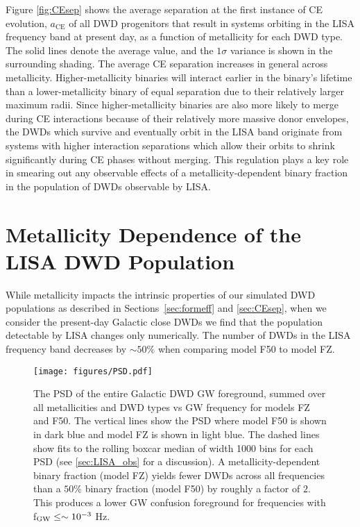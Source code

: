 \documentclass[twocolumn]{aastex631}
\begin{document}
Figure \ref{fig:CEsep} shows the average separation at the first instance of CE evolution, $a_{\text{CE}}$ of all DWD progenitors that result in systems orbiting in the LISA frequency band at present day, as a function of metallicity for each DWD type. The solid lines denote the average value, and the $1\sigma$ variance is shown in the surrounding shading. The average CE separation increases in general across metallicity. Higher-metallicity binaries will interact earlier in the binary's lifetime than a lower-metallicity binary of equal separation due to their relatively larger maximum radii. Since higher-metallicity binaries are also more likely to merge during CE interactions because of their relatively more massive donor envelopes, the DWDs which survive and eventually orbit in the LISA band originate from systems with higher interaction separations which allow their orbits to shrink significantly during CE phases without merging. This regulation plays a key role in smearing out any observable effects of a metallicity-dependent binary fraction in the population of DWDs observable by LISA. 


\section{Metallicity Dependence of the LISA DWD Population}
\label{sec:LISA_met}

While metallicity impacts the intrinsic properties of our simulated DWD populations as described in Sections~\ref{sec:formeff} and \ref{sec:CEsep}, when we consider the present-day Galactic close DWDs we find that the population detectable by LISA changes only numerically. The number of DWDs in the LISA frequency band decreases by $\sim50\%$ when comparing model F50 to model FZ.


\begin{figure}
	\texttt{[image: figures/PSD.pdf]}
    \caption{The PSD of the entire Galactic DWD GW foreground, summed over all metallicities and DWD types vs GW frequency for models FZ and F50. The vertical lines show the PSD where model F50 is shown in dark blue and model FZ is shown in light blue. The dashed lines show fits to the rolling boxcar median of width 1000 bins for each PSD (see \ref{sec:LISA_obs} for a discussion). A metallicity-dependent binary fraction (model FZ) yields fewer DWDs across all frequencies than a $50\%$ binary fraction (model F50) by roughly a factor of $2$. This produces a lower GW confusion foreground for frequencies with f$_{\rm{GW}}\leq\sim10^{-3}$ Hz.}
    \label{fig:PSD}
\end{figure}
\end{document}
